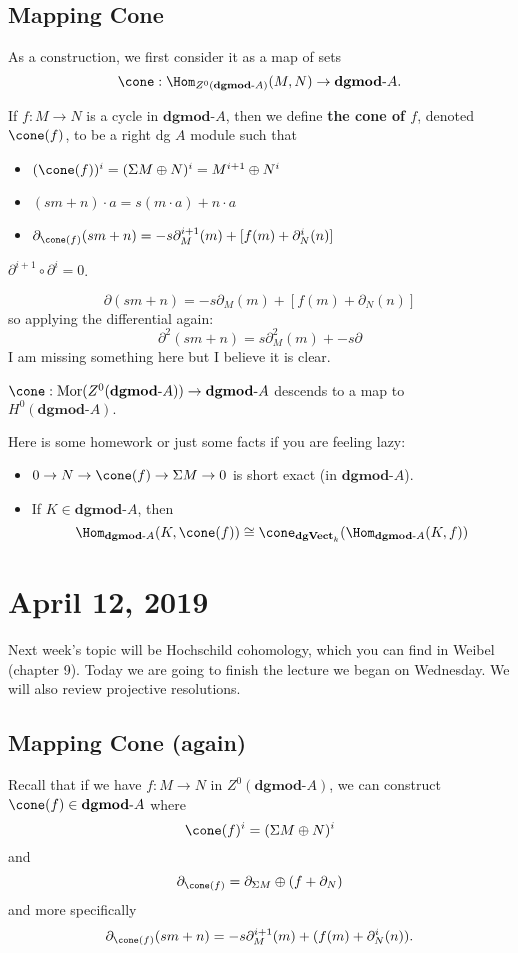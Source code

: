 \documentclass[12pt]{article}
\newcommand*{\dgVectk}{\mathbf{dgVect}_k}
\newcommand*{\dgmodA}{\mathbf{dgmod}\text{-}A}
\begin{document}
\subsection{Mapping Cone}
As a construction, we first consider it as a map of sets
\[\cone:\Hom_{Z^0(\dgmodA)}(M,N)\to \dgmodA.\]
\begin{defn}
	If $f:M\to N$ is a cycle in $\dgmodA$, then we define \textbf{the cone of $f$}, denoted $\cone(f)$,
	to be a right dg $A$ module such that
	\begin{itemize}
		\item $(\cone(f))^i=(\Sigma M\oplus N)^i=M^{i+1}\oplus N^i$
		\item $(sm+n)\cdot a=s(m\cdot a)+n\cdot a$
		\item $\partial_{\cone(f)}(sm+n)=-s\partial_M^{i+1}(m)+[f(m)+\partial_N^i(n)]$
	\end{itemize}
\end{defn}
\begin{lem}
	$\partial^{i+1}\circ\partial^i=0$.
\end{lem}
\begin{prf}
	\[\partial(sm+n)=-s\partial_M(m)+[f(m)+\partial_N(n)]\]
	so applying the differential again:
	\[\partial^2(sm+n)=s\partial_M^2(m)+-s\partial\]
	I am missing something here but I believe it is clear.
\end{prf}
\begin{thm}
	$\cone:\operatorname{Mor}(Z^0(\dgmodA))\to \dgmodA$ descends to a map to $H^0(\dgmodA).$
\end{thm}
Here is some homework or just some facts if you are feeling lazy:
\begin{itemize}
	\item $0\to N\to \cone(f)\to \Sigma M\to 0$ is short exact (in $\dgmodA$).
	\item If $K\in \dgmodA$, then 
	\[\Hom_{\dgmodA}(K,\cone(f))\cong\cone_{\dgVectk}(\Hom_{\dgmodA}(K,f))\]
\end{itemize}

\section{April 12, 2019}
Next week's topic will be Hochschild cohomology, which you can find in Weibel (chapter 9). Today we are going to finish
the lecture we began on Wednesday. We will also review projective resolutions.

\subsection{Mapping Cone (again)}
Recall that if we have $f:M\to N$ in $Z^0(\dgmodA)$, we can construct $\cone(f)\in\dgmodA$ where
\[\cone(f)^i=(\Sigma M\oplus N)^i\]
and
\[\partial_{\cone(f)}=\partial_{\Sigma M}\oplus(f+\partial_N)\]
and more specifically
\[\partial_{\cone(f)}(sm+n)=-s\partial_M^{i+1}(m)+(f(m)+\partial_N^i(n)).\]
\end{document}
